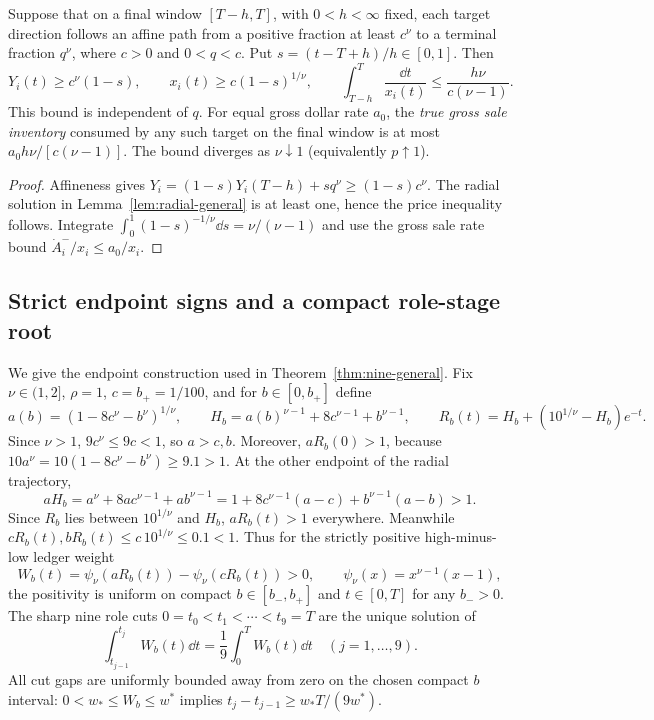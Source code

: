 \documentclass[review,hidelinks,onefignum,onetabnum]{siamonline250211}%
\begin{document}
\begin{lemma}
\label{lem:terminal-inventory}
Suppose that on a final window $[T-h,T]$, with
$0<h<\infty$ fixed, each target direction follows an affine
path from a positive fraction at least $c^\nu$ to a terminal
fraction $q^\nu$, where $c>0$ and $0<q<c$. Put
$s=(t-T+h)/h\in[0,1]$. Then
\begin{equation}\label{eq:inventory-general}
 Y_i(t)\ge c^\nu(1-s),\qquad
 x_i(t)\ge c(1-s)^{1/\nu},\qquad
 \int_{T-h}^T\frac{\dd t}{x_i(t)}
 \le\frac{h\nu}{c(\nu-1)}.
\end{equation}
This bound is independent of $q$. For equal gross dollar
rate $a_0$, the \emph{true gross sale inventory} consumed
by any such target on the final window is at most
$a_0h\nu/[c(\nu-1)]$. The bound diverges as
$\nu\downarrow1$ (equivalently $p\uparrow1$).
\end{lemma}
\begin{proof}
Affineness gives
$Y_i=(1-s)Y_i(T-h)+s q^\nu\ge(1-s)c^\nu$.
The radial solution in Lemma~\ref{lem:radial-general}
is at least one, hence the price inequality follows.
Integrate $\int_0^1(1-s)^{-1/\nu}\dd s
=\nu/(\nu-1)$ and use the gross sale rate bound
$\dot A_i^-/x_i\le a_0/x_i$.
\end{proof}

\subsection{Strict endpoint signs and a compact role-stage root}
\label{app:general-ends}
We give the endpoint construction used in
Theorem~\ref{thm:nine-general}. Fix $\nu\in(1,2]$,
$\rho=1$, $c=b_+=1/100$, and for $b\in[0,b_+]$ define
\[
 a(b)=(1-8c^\nu-b^\nu)^{1/\nu},\qquad
 H_b=a(b)^{\nu-1}+8c^{\nu-1}+b^{\nu-1},\qquad
 R_b(t)=H_b+(10^{1/\nu}-H_b)e^{-t}.
\]
Since $\nu>1$, $9c^\nu\le9c<1$, so $a>c,b$.
Moreover, $aR_b(0)>1$, because
$10a^\nu=10(1-8c^\nu-b^\nu)\ge9.1>1$.
At the other endpoint of the radial trajectory,
\begin{equation}\label{eq:nu-high-sign}
 aH_b=a^\nu+8ac^{\nu-1}+ab^{\nu-1}
 =1+8c^{\nu-1}(a-c)+b^{\nu-1}(a-b)>1.
\end{equation}
Since $R_b$ lies between $10^{1/\nu}$ and $H_b$,
$aR_b(t)>1$ everywhere. Meanwhile
$cR_b(t),bR_b(t)\le c\,10^{1/\nu}\le0.1<1$.
Thus for the strictly positive high-minus-low ledger weight
\begin{equation}\label{eq:nu-weight}
 W_b(t)=\psi_\nu(aR_b(t))-\psi_\nu(cR_b(t))>0,
 \qquad\psi_\nu(x)=x^{\nu-1}(x-1),
\end{equation}
the positivity is uniform on compact
$b\in[b_-,b_+]$ and $t\in[0,T]$ for any $b_->0$.
The sharp nine role cuts $0=t_0<t_1<\cdots<t_9=T$ are
the unique solution of
\[
 \int_{t_{j-1}}^{t_j}W_b(t)\dd t
 =\frac19\int_0^T W_b(t)\dd t\quad(j=1,\ldots,9).
\]
All cut gaps are uniformly bounded away from zero on the
chosen compact $b$ interval: $0<w_*\le W_b\le w^*$
implies $t_j-t_{j-1}\ge w_*T/(9w^*)$.
\end{document}
